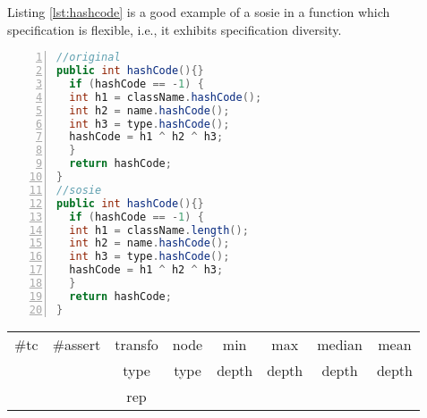 Listing \ref{lst:hashcode} is a good example of a sosie in a function which specification is flexible, i.e., it exhibits specification diversity. 

\begin{minipage}{\columnwidth}
\begin{lstlisting}[caption={\texttt{hashCode} in Rhino and a sosie},label={lst:hashcode},language=java,numbers=left]
//original
public int hashCode(){}
  if (hashCode == -1) {
  int h1 = className.hashCode();
  int h2 = name.hashCode();
  int h3 = type.hashCode();
  hashCode = h1 ^ h2 ^ h3;
  }
  return hashCode;
}
//sosie
public int hashCode(){}
  if (hashCode == -1) {
  int h1 = className.length();
  int h2 = name.hashCode();
  int h3 = type.hashCode();
  hashCode = h1 ^ h2 ^ h3;
  }
  return hashCode;
}
\end{lstlisting}
\tabcolsep=0.11cm
\begin{tabular}{>{\small}c>{\small}c>{\small}c>{\small}c>{\small}c>{\small}c>{\small}c>{\small}c}
\hline
\rowcolor{lightgray} \#tc & \#assert & transfo & node & min & max & median & mean   \\
\rowcolor{lightgray}  & & type & type & depth  & depth & depth & depth  \\ 
\hline
&  & rep &  &  &  &  & \\
\hline
\end{tabular}
\end{minipage}